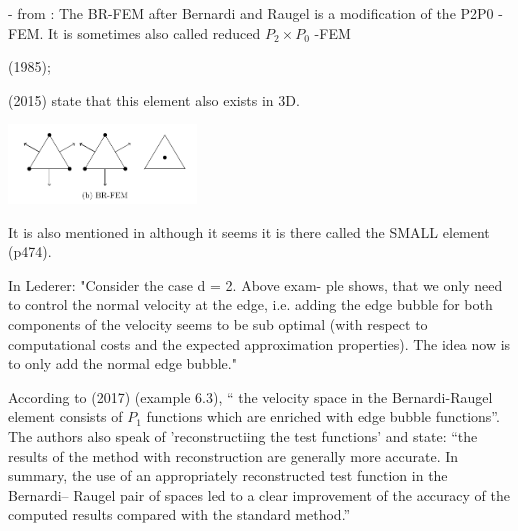 
- from \textcite{cakp15}: The BR-FEM after Bernardi and Raugel \cite{bera85} is a modification of the P2P0 - FEM.
It is sometimes also called reduced $P_2\times P_0$ -FEM \cite{cakp15}

\textcite{bera85} (1985); 

\textcite{cakp15} (2015) state that this element also exists in 3D.

\includegraphics[width=5cm]{images/pair_bernardi_raugel/cakp15}

It is also mentioned in \textcite{bobf13} although it seems it is there called the SMALL element (p474).

In Lederer: "Consider the case d = 2. Above exam-
ple shows, that we only need to control the normal velocity at the edge, i.e. adding the
edge bubble for both components of the velocity seems to be sub optimal (with respect to
computational costs and the expected approximation properties). The idea now is to only
add the normal edge bubble."

According to \textcite{jolm17} (2017) (example 6.3), `` the velocity space in the Bernardi-Raugel
element consists of $P_1$ functions which are enriched with edge bubble functions''.
The authors also speak of 'reconstructiing the test functions' and state: 
``the results of the method with reconstruction are generally more accurate.
In summary, the use of an appropriately reconstructed test function in the Bernardi–
Raugel pair of spaces led to a clear improvement of the accuracy of the computed
results compared with the standard method.''


